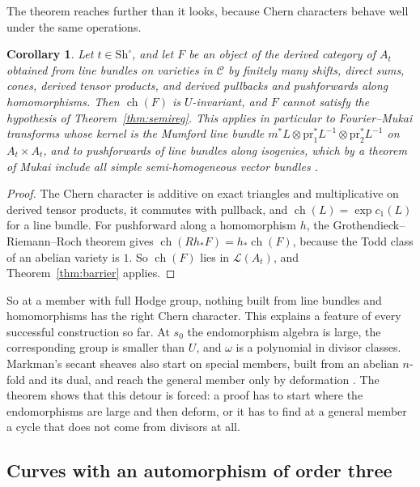 \documentclass[11pt]{amsart}
\newtheorem{corollary}[theorem]{Corollary}
\theoremstyle{definition}
\theoremstyle{remark}
\newcommand{\Sh}{\mathrm{Sh}}
\begin{document}
The theorem reaches further than it looks, because Chern characters behave
well under the same operations.

\begin{corollary}\label{cor:barrier}
Let $t\in\Sh^{\circ}$, and let $F$ be an object of the derived category of
$A_{t}$ obtained from line bundles on varieties in $\mathcal C$ by finitely
many shifts, direct sums, cones, derived tensor products, and derived
pullbacks and pushforwards along homomorphisms. Then $\operatorname{ch}(F)$
is $U$-invariant, and $F$ cannot satisfy the hypothesis of
Theorem~\ref{thm:semireg}. This applies in particular to Fourier--Mukai
transforms whose kernel is the Mumford line bundle
$m^{*}L\otimes\mathrm{pr}_{1}^{*}L^{-1}\otimes\mathrm{pr}_{2}^{*}L^{-1}$ on
$A_{t}\times A_{t}$, and to pushforwards of line bundles along isogenies,
which by a theorem of Mukai include all simple semi-homogeneous vector
bundles \cite{Muk78}.
\end{corollary}

\begin{proof}
The Chern character is additive on exact triangles and multiplicative on
derived tensor products, it commutes with pullback, and
$\operatorname{ch}(L)=\exp c_{1}(L)$ for a line bundle. For pushforward
along a homomorphism $h$, the Grothendieck--Riemann--Roch theorem gives
$\operatorname{ch}(Rh_{*}F)=h_{*}\operatorname{ch}(F)$, because the Todd
class of an abelian variety is $1$. So $\operatorname{ch}(F)$ lies in
$\mathcal L(A_{t})$, and Theorem~\ref{thm:barrier} applies.
\end{proof}

So at a member with full Hodge group, nothing built from line bundles and
homomorphisms has the right Chern character. This explains a feature of
every successful construction so far. At $s_{0}$ the endomorphism algebra
is large, the corresponding group is smaller than $U$, and $\omega$ is a
polynomial in divisor classes. Markman's secant sheaves also start on
special members, built from an abelian $n$-fold and its dual, and reach the
general member only by deformation \cite{Mar25a,Mar25b}. The theorem shows
that this detour is forced: a proof has to start where the endomorphisms
are large and then deform, or it has to find at a general member a cycle
that does not come from divisors at all.

\subsection{Curves with an automorphism of order three}
\end{document}
